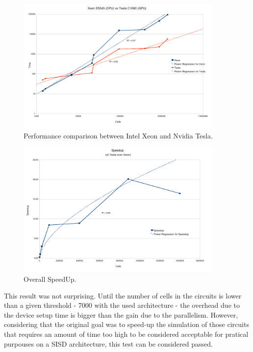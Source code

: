 \begin{figure}[h!bt]
	\centerline{\includegraphics[width=0.9\textwidth]{img/xeonvstesla.png}}
	\caption{Performance comparison between Intel Xeon and Nvidia Tesla.}
	\label{fig:NvidiaGPUsLogicalOrg}
\end{figure}

\begin{figure}[h!bt]
        \centerline{\includegraphics[width=0.9\textwidth]{img/speedup.png}}
        \caption{Overall SpeedUp.}
        \label{fig:NvidiaGPUsLogicalOrg}
\end{figure}

This result was not surprising. Until the number of cells in the circuits is lower than a given threshold - 7000 with the used architecture - the overhead due to the device setup time is bigger than the gain due to the parallelism. However, considering that the original goal was to speed-up the simulation of those circuits that requires an amount of time too high to be considered acceptable for pratical purpouses on a SISD architecture, this test can be considered passed.

